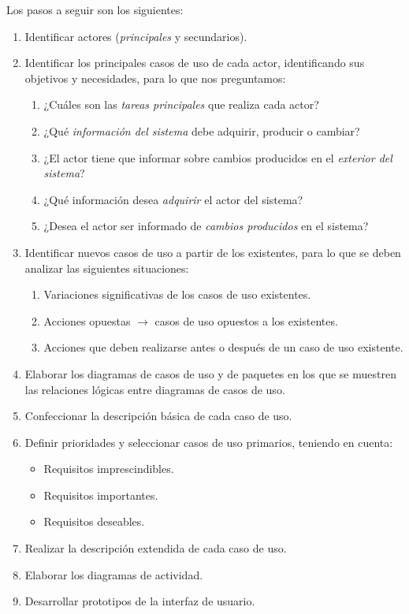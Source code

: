 \documentclass[12pt,spanish]{article}
\begin{document}
Los pasos a seguir son los siguientes:
\begin{enumerate}
	\item Identificar actores (\emph{principales} y secundarios).
	\item Identificar los principales casos de uso de cada actor, identificando sus objetivos y necesidades, para lo que nos preguntamos:
		\begin{enumerate}
			\item ¿Cuáles son las \emph{tareas principales} que realiza cada actor?
			\item ¿Qué \emph{información del sistema} debe adquirir, producir o cambiar?
			\item ¿El actor tiene que informar sobre cambios producidos en el \emph{exterior del sistema}?
			\item ¿Qué información desea \emph{adquirir} el actor del sistema?
			\item ¿Desea el actor ser informado de \emph{cambios producidos} en el sistema?
		\end{enumerate}
	\item Identificar nuevos casos de uso a partir de los existentes, para lo que se deben analizar las siguientes situaciones:
		\begin{enumerate}
			\item Variaciones significativas de los casos de uso existentes.
			\item Acciones opuestas $\rightarrow$ casos de uso opuestos a los existentes.
			\item Acciones que deben realizarse antes o después de un caso de uso existente.
		\end{enumerate}
		\item Elaborar los diagramas de casos de uso y de paquetes en los que se muestren las relaciones lógicas entre diagramas de casos de uso.
		\item Confeccionar la descripción básica de cada caso de uso.
		\item Definir prioridades y seleccionar casos de uso primarios, teniendo en cuenta:
			\begin{itemize}
				\item Requisitos imprescindibles.
				\item Requisitos importantes.
				\item Requisitos deseables.
			\end{itemize}
		\item Realizar la descripción extendida de cada caso de uso.
		\item Elaborar los diagramas de actividad.
		\item Desarrollar prototipos de la interfaz de usuario.
\end{enumerate}
\end{document}
